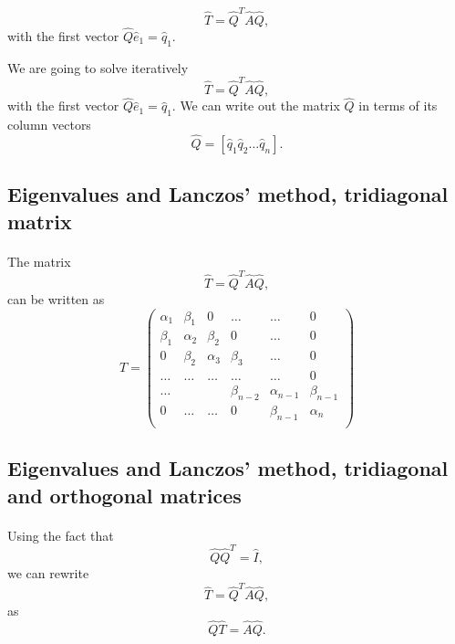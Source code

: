 \noindent
\[
\hat{T}= \hat{Q}^{T}\hat{A}\hat{Q},
\]
with the first vector $\hat{Q}\hat{e}_1=\hat{q}_1$.

We are going to solve iteratively
\[
\hat{T}= \hat{Q}^{T}\hat{A}\hat{Q},
\]
with the first vector $\hat{Q}\hat{e}_1=\hat{q}_1$.
We can write out the matrix $\hat{Q}$ in terms of its column vectors 
\[
\hat{Q}=\left[\hat{q}_1\hat{q}_2\dots\hat{q}_n\right].
\]



\subsection*{Eigenvalues and Lanczos' method, tridiagonal matrix}

\paragraph{}
The matrix
\[
\hat{T}= \hat{Q}^{T}\hat{A}\hat{Q},
\]
can be written as 
\[
    \hat{T} = \left(\begin{array}{cccccc}
                           \alpha_1& \beta_1 & 0 &\dots   & \dots &0 \\
                           \beta_1 & \alpha_2 & \beta_2 &0 &\dots &0 \\
                           0& \beta_2 & \alpha_3 & \beta_3 & \dots &0 \\
                           \dots& \dots   & \dots &\dots   &\dots & 0 \\
                           \dots&   &  &\beta_{n-2}  &\alpha_{n-1}& \beta_{n-1} \\
                           0&  \dots  &\dots  &0   &\beta_{n-1} & \alpha_{n} \\
                      \end{array} \right)
\]



\subsection*{Eigenvalues and Lanczos' method, tridiagonal and orthogonal matrices}

\paragraph{}
Using the fact that 
\[
\hat{Q}\hat{Q}^T=\hat{I}, 
\]
we can rewrite 
\[
\hat{T}= \hat{Q}^{T}\hat{A}\hat{Q},
\]
as 
\[
\hat{Q}\hat{T}= \hat{A}\hat{Q}.
\]



